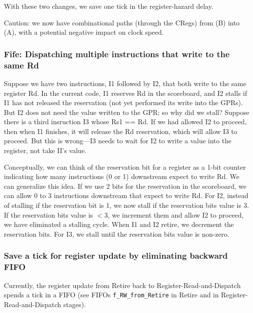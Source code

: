 With these two changes, we save one tick in the register-hazard delay.

Caution: we now have combinational paths (through the CRegs) from
(B) into (A), with a potential negative impact on clock speed.


\subsubsection{Fife: Dispatching multiple instructions that write to the same Rd}

Suppose we have two instructions, I1 followed by I2, that both write
to the same register Rd.  In the current code, I1 reserves Rd in the
scoreboard, and I2 stalls if I1 has not released the reservation (not
yet performed its write into the GPRs).  But I2 does not need the
value written to the GPR; so why did we stall?  Suppose there is a
third insruction I3 whose Rs1 == Rd.  If we had allowed I2 to proceed,
then when I1 finishes, it will release the Rd reservation, which will
allow I3 to proceed.  But this is wrong---I3 needs to wait for I2 to
write a value into the register, not take II's value.

Conceptually, we can think of the reservation bit for a register as a
1-bit counter indicating how many instructions (0 or 1) downstream
expect to write Rd.  We can generalize this idea. If we use 2 bits for
the reservation in the scoreboard, we can allow 0 to 3 instructions
downstream that expect to write Rd.  For I2, instead of stalling if
the reservation bit is 1, we now stall if the reservation bits value
is 3.  If the reservation bits value is $< 3$, we increment them and
allow I2 to proceed, {\ie} we have eliminated a stalling cycle.  When
I1 and I2 retire, we decrement the reservation bits.  For I3, we stall
until the reservation bits value is non-zero.


\subsubsection{Save a tick for register update by eliminating backward FIFO}

Currently, the register update from Retire back to
Register-Read-and-Dispatch spends a tick in a FIFO (see FIFOs
\verb|f_RW_from_Retire| in Retire and in Register-Read-and-Dispatch
stages).

